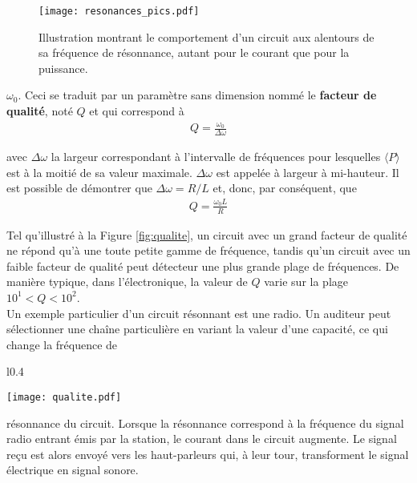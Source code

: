 \documentclass[titlepage,oneside,a4paper,11pt]{book} %
\begin{document}
\begin{figure}[H]
  \begin{center}
    \texttt{[image: resonances\_pics.pdf]}
    \caption{Illustration montrant le comportement d'un circuit aux alentours de sa fréquence de résonnance, autant pour le courant que pour la puissance.}
    \label{fig:resonance}
  \end{center}
\end{figure}


$\omega_0$.  Ceci se traduit par un paramètre sans dimension nommé le \textbf{facteur de qualité}, noté $Q$ et qui correspond à 
\begin{align}
    Q=\frac{\omega_0}{\Delta \omega}
    \label{eq:quality}
\end{align}



avec $\Delta \omega$ la largeur correspondant à l'intervalle de fréquences pour lesquelles $\langle P \rangle$ est à la moitié de sa valeur maximale.  $\Delta \omega$ est appelée à largeur à mi-hauteur.  Il est possible de démontrer que $\Delta \omega = R/L$ et, donc, par conséquent, que
\begin{align*}
    Q = \frac{\omega_0 L}{R}
\end{align*}

Tel qu'illustré à la Figure \ref{fig:qualite}, un circuit avec un grand facteur de qualité ne répond qu'à une toute petite gamme de fréquence, tandis qu'un circuit avec un faible facteur de qualité peut détecteur une plus grande plage de fréquences.  De manière typique, dans l'électronique, la valeur de $Q$ varie sur la plage $10^1<Q<10^2$.\\

Un exemple particulier d'un circuit résonnant est une radio.  Un auditeur peut sélectionner une chaîne particulière en variant la valeur d'une capacité, ce qui change la fréquence de

\begin{wrapfigure}{l}{0.4\textwidth}
  \begin{center}
    \texttt{[image: qualite.pdf]}
    \caption{Deux circuits possédant la même fréquence de résonnance peuvent réagir différement à certaines fréquences d'exitation si leur facteurs de qualité diffèrent.}
    \label{fig:qualite}
  \end{center}
\end{wrapfigure}


résonnance du circuit.  Lorsque la résonnance correspond à la fréquence du signal radio entrant émis par la station, le courant dans le circuit augmente.  Le signal reçu est alors envoyé vers les haut-parleurs qui, à leur tour, transforment le signal électrique en signal sonore.  
\end{document}
